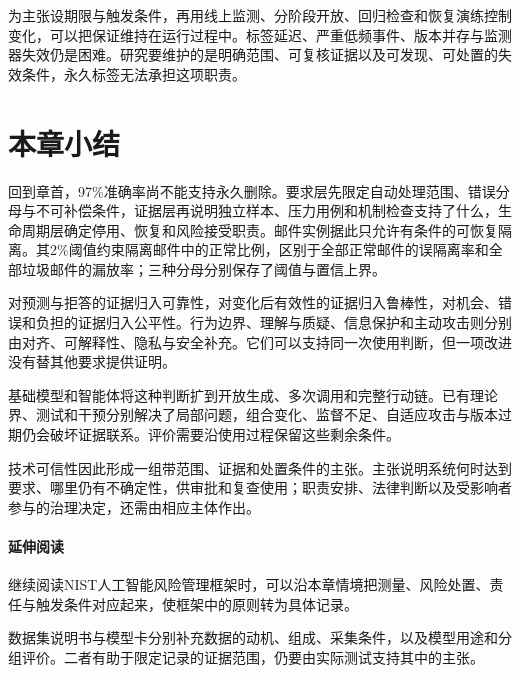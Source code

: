 为主张设期限与触发条件，再用线上监测、分阶段开放、回归检查和恢复演练控制变化，可以把保证维持在运行过程中。标签延迟、严重低频事件、版本并存与监测器失效仍是困难。研究要维护的是明确范围、可复核证据以及可发现、可处置的失效条件，永久标签无法承担这项职责。

\section{本章小结}
\label{sec:trust-foundations-summary}

回到章首，97\%准确率尚不能支持永久删除。要求层先限定自动处理范围、错误分母与不可补偿条件，证据层再说明独立样本、压力用例和机制检查支持了什么，生命周期层确定停用、恢复和风险接受职责。邮件实例据此只允许有条件的可恢复隔离。其2\%阈值约束隔离邮件中的正常比例，区别于全部正常邮件的误隔离率和全部垃圾邮件的漏放率；三种分母分别保存了阈值与置信上界。

对预测与拒答的证据归入可靠性，对变化后有效性的证据归入鲁棒性，对机会、错误和负担的证据归入公平性。行为边界、理解与质疑、信息保护和主动攻击则分别由对齐、可解释性、隐私与安全补充。它们可以支持同一次使用判断，但一项改进没有替其他要求提供证明。

基础模型和智能体将这种判断扩到开放生成、多次调用和完整行动链。已有理论界、测试和干预分别解决了局部问题，组合变化、监督不足、自适应攻击与版本过期仍会破坏证据联系。评价需要沿使用过程保留这些剩余条件。

技术可信性因此形成一组带范围、证据和处置条件的主张。主张说明系统何时达到要求、哪里仍有不确定性，供审批和复查使用；职责安排、法律判断以及受影响者参与的治理决定，还需由相应主体作出。

\paragraph{延伸阅读}

继续阅读NIST人工智能风险管理框架时，可以沿本章情境把测量、风险处置、责任与触发条件对应起来，使框架中的原则转为具体记录。

数据集说明书与模型卡分别补充数据的动机、组成、采集条件，以及模型用途和分组评价。二者有助于限定记录的证据范围，仍要由实际测试支持其中的主张。
